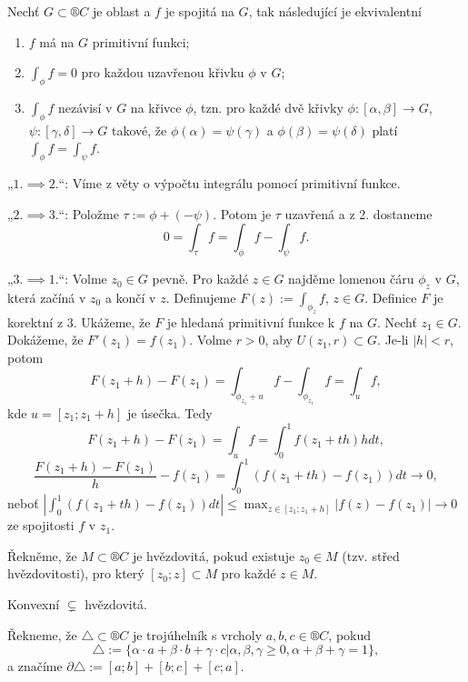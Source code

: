\documentclass[12pt]{article}					%
\begin{document}
\begin{veta}
	Nechť $G \subset ®C$ je oblast a $f$ je spojitá na $G$, tak následující je ekvivalentní
	\begin{enumerate}
		\item $f$ má na $G$ primitivní funkci;
		\item $\int_\phi f = 0$ pro každou uzavřenou křivku $\phi$ v $G$;
		\item $\int_\phi f$ nezávisí v $G$ na křivce $\phi$, tzn. pro každé dvě křivky $\phi: [\alpha, \beta] \rightarrow G$, $\psi: [\gamma, \delta] \rightarrow G$ takové, že $\phi(\alpha) = \psi(\gamma)$ a $\phi(\beta) = \psi(\delta)$ platí $\int_\phi f = \int_\psi f$.
	\end{enumerate}

	\begin{dukazin}
		„$1. \implies 2.$“: Víme z věty o výpočtu integrálu pomocí primitivní funkce.

		„$2. \implies 3.$“: Položme $\tau := \phi + (- \psi)$. Potom je $\tau$ uzavřená a z 2. dostaneme
		$$ 0 = \int_\tau f = \int_\phi f - \int_\psi f. $$

		„$3. \implies 1.$“: Volme $z_0 \in G$ pevně. Pro každé $z \in G$ najděme lomenou čáru $\phi_z$ v $G$, která začíná v $z_0$ a končí v $z$. Definujeme $F(z) := \int_{\phi_z} f$, $z \in G$. Definice $F$ je korektní z 3. Ukážeme, že $F$ je hledaná primitivní funkce k $f$ na $G$. Nechť $z_1 \in G$. Dokážeme, že $F'(z_1) = f(z_1)$. Volme $r > 0$, aby $U(z_1, r) \subset G$. Je-li $|h| < r$, potom
		$$ F(z_1 + h) - F(z_1) = \int_{\phi_{z_1} + u} f - \int_{\phi_{z_1}} f = \int_u f, $$
		kde $u = [z_1; z_1 + h]$ je úsečka. Tedy
		$$ F(z_1 + h) - F(z_1) = \int_u f = \int_0^1 f(z_1 + th)h dt, $$
		$$ \frac{F(z_1 + h) - F(z_1)}{h} - f(z_1) = \int_0^1 (f(z_1 + th) - f(z_1))dt \rightarrow 0, $$
		neboť $|\int_0^1 (f(z_1 + th) - f(z_1))dt| ≤ \max_{z \in [z_1; z_1+h]} |f(z) - f(z_1)| \rightarrow 0$ ze spojitosti $f$ v $z_1$.
	\end{dukazin}
\end{veta}

\begin{poznamka}[Značení]
	Řekněme, že $M \subset ®C$ je hvězdovitá, pokud existuje $z_0 \in M$ (tzv. střed hvězdovitosti), pro který $[z_0; z] \subset M$ pro každé $z \in M$.

	\begin{poznamkain}
		Konvexní $\subsetneq$ hvězdovitá.
	\end{poznamkain}

	Řekneme, že $\triangle \subset ®C$ je trojúhelník s vrcholy $a, b, c \in ®C$, pokud
	$$ \triangle := \{\alpha·a + \beta·b + \gamma·c | \alpha, \beta, \gamma ≥ 0, \alpha + \beta + \gamma = 1\}, $$
	a značíme $\partial \triangle := [a; b] + [b; c] + [c; a]$.
\end{poznamka}
\end{document}
